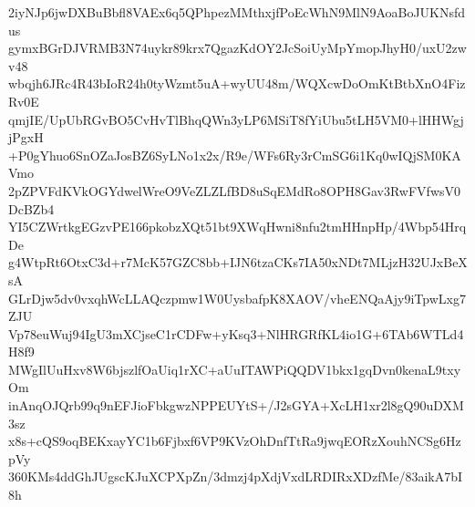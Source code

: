 2iyNJp6jwDXBuBbfl8VAEx6q5QPhpezMMthxjfPoEcWhN9MlN9AoaBoJUKNsfdus
gymxBGrDJVRMB3N74uykr89krx7QgazKdOY2JcSoiUyMpYmopJhyH0/uxU2zwv48
wbqjh6JRc4R43bIoR24h0tyWzmt5uA+wyUU48m/WQXcwDoOmKtBtbXnO4FizRv0E
qmjIE/UpUbRGvBO5CvHvTlBhqQWn3yLP6MSiT8fYiUbu5tLH5VM0+lHHWgjjPgxH
+P0gYhuo6SnOZaJosBZ6SyLNo1x2x/R9e/WFs6Ry3rCmSG6i1Kq0wIQjSM0KAVmo
2pZPVFdKVkOGYdwelWreO9VeZLZLfBD8uSqEMdRo8OPH8Gav3RwFVfwsV0DcBZb4
YI5CZWrtkgEGzvPE166pkobzXQt51bt9XWqHwni8nfu2tmHHnpHp/4Wbp54HrqDe
g4WtpRt6OtxC3d+r7McK57GZC8bb+IJN6tzaCKs7IA50xNDt7MLjzH32UJxBeXsA
GLrDjw5dv0vxqhWcLLAQczpmw1W0UysbafpK8XAOV/vheENQaAjy9iTpwLxg7ZJU
Vp78euWuj94IgU3mXCjseC1rCDFw+yKsq3+NlHRGRfKL4io1G+6TAb6WTLd4H8f9
MWgIlUuHxv8W6bjszlfOaUiq1rXC+aUuITAWPiQQDV1bkx1gqDvn0kenaL9txyOm
inAnqOJQrb99q9nEFJioFbkgwzNPPEUYtS+/J2sGYA+XcLH1xr2l8gQ90uDXM3sz
x8s+cQS9oqBEKxayYC1b6Fjbxf6VP9KVzOhDnfTtRa9jwqEORzXouhNCSg6HzpVy
360KMs4ddGhJUgscKJuXCPXpZn/3dmzj4pXdjVxdLRDIRxXDzfMe/83aikA7bI8h
